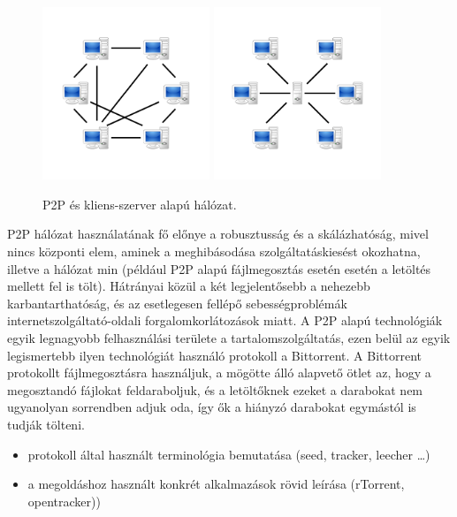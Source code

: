 \begin{figure}[ht]
	\centering
	\includegraphics[width=50mm, keepaspectratio]{figures/P2P-network.png}\hspace{1cm}
	\includegraphics[width=50mm, keepaspectratio]{figures/Server-based-network.png}
	\caption{P2P és kliens-szerver alapú hálózat.}%
	\label{fig:networkcomparison}
\end{figure}

P2P hálózat használatának fő előnye a robusztusság és a skálázhatóság, mivel nincs központi elem,
aminek a meghibásodása szolgáltatáskiesést okozhatna, illetve a hálózat min (például P2P alapú fájlmegosztás esetén esetén a letöltés
mellett fel is tölt). Hátrányai közül a két legjelentősebb a nehezebb karbantarthatóság, és az
esetlegesen fellépő sebességproblémák internetszolgáltató-oldali forgalomkorlátozások miatt.
A P2P alapú technológiák egyik legnagyobb felhasználási területe a tartalomszolgáltatás, ezen belül
az egyik legismertebb ilyen technológiát használó protokoll a Bittorrent. A Bittorrent~\cite{cohen2008bittorrent} protokollt
fájlmegosztásra használjuk, a mögötte álló alapvető ötlet az, hogy a megosztandó fájlokat
feldaraboljuk, és a letöltőknek ezeket a darabokat nem ugyanolyan sorrendben adjuk oda, így ők a
hiányzó darabokat egymástól is tudják tölteni. 

\begin{itemize}
  \item protokoll által használt terminológia bemutatása (seed, tracker, leecher \ldots)
  \item a megoldáshoz használt konkrét alkalmazások rövid leírása (rTorrent, opentracker))
\end{itemize}


